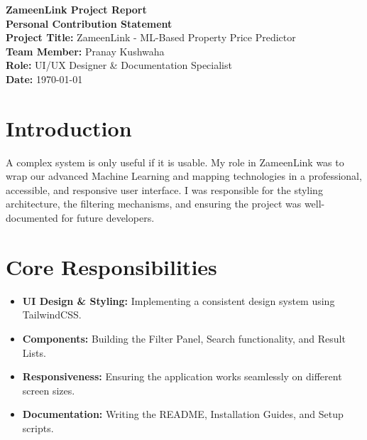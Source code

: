 \documentclass[12pt, a4paper]{article}
\begin{document}
\begin{titlepage}
    \centering
    \vspace*{2cm}
    {\Huge \textbf{ZameenLink Project Report}}\\[1.5cm]
    {\Large \textbf{Personal Contribution Statement}}\\[1cm]
    
    \textbf{Project Title:} ZameenLink - ML-Based Property Price Predictor\\
    \textbf{Team Member:} Pranay Kushwaha\\
    \textbf{Role:} UI/UX Designer \& Documentation Specialist\\
    \textbf{Date:} \today\\[3cm]
    
    \begin{abstract}
        This report summarizes Pranay Kushwaha's contributions to the ZameenLink project. It focuses on the User Interface design, TailwindCSS implementation, responsive layouts, search functionality, and comprehensive project documentation.
    \end{abstract}
    
    \vfill
\end{titlepage}

\tableofcontents
\newpage

\section{Introduction}
A complex system is only useful if it is usable. My role in ZameenLink was to wrap our advanced Machine Learning and mapping technologies in a professional, accessible, and responsive user interface. I was responsible for the styling architecture, the filtering mechanisms, and ensuring the project was well-documented for future developers.

\section{Core Responsibilities}
\begin{itemize}
    \item \textbf{UI Design & Styling:} Implementing a consistent design system using TailwindCSS.
    \item \textbf{Components:} Building the Filter Panel, Search functionality, and Result Lists.
    \item \textbf{Responsiveness:} Ensuring the application works seamlessly on different screen sizes.
    \item \textbf{Documentation:} Writing the README, Installation Guides, and Setup scripts.
\end{itemize}
\end{document}
